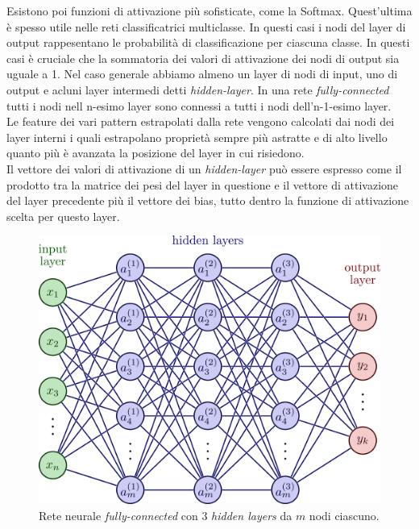 \documentclass[12pt,a4paper,openright,twoside]{report}
\begin{document}
Esistono poi funzioni di attivazione più sofisticate, come la Softmax.
Quest'ultima è spesso utile nelle reti classificatrici multiclasse. In questi casi i nodi del layer di output rappesentano le probabilità di classificazione per ciascuna classe. In questi casi è cruciale che la sommatoria dei valori di attivazione dei nodi di output sia uguale a 1.
\newpage
Nel caso generale abbiamo almeno un layer di nodi di input, uno di output e acluni layer intermedi detti \emph{hidden-layer}.
In una rete \emph{fully-connected} tutti i nodi nell n-esimo layer sono connessi a tutti i nodi dell'n-1-esimo layer. \\
Le feature dei vari pattern estrapolati dalla rete vengono calcolati dai nodi dei layer interni i quali estrapolano proprietà sempre più astratte e di alto livello quanto più è avanzata la posizione del layer in cui risiedono. \\
Il vettore dei valori di attivazione di un \emph{hidden-layer} può essere espresso come il prodotto tra la matrice dei pesi del layer in questione e il vettore di attivazione del layer precedente più il vettore dei bias, tutto dentro la funzione di attivazione scelta per questo layer.

\begin{figure}[h]
\centering
\includegraphics[width=\linewidth]{neural_networks-004.png}
\caption{Rete neurale \emph{fully-connected} con $3$ \emph{hidden layers} da $m$ nodi ciascuno.}
\end{figure}
\end{document}
